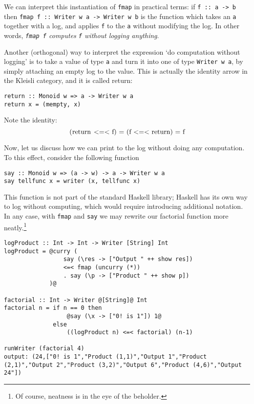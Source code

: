 \documentclass[11pt]{article}
\theoremstyle{nonumberplain}
\newcommand*\lsin{\lstinline}
\newcommand*\lsmath[1]{\text{\lstinline|#1|}}
\begin{document}
We can interpret this instantiation of \lsin|fmap| in practical terms: if \lsin|f :: a -> b| then \lsin|fmap f :: Writer w a -> Writer w b| is the function which takes an \lsin|a| together with a log, and applies \lsin|f| to the \lsin|a| without modifying the log. In other words, \emph{\lsin|fmap f| computes \lsin|f| without logging anything}.

\smallskip

Another (orthogonal) way to interpret the expression `do computation without logging' is to take a value of type \lsin|a| and turn it into one of type \lsin|Writer w a|, by simply attaching an empty log to the value. This is actually the identity arrow in the Kleisli category, and it is called return:
\begin{lstlisting}
return :: Monoid w => a -> Writer w a
return x = (mempty, x)
\end{lstlisting}

Note the identity:
\begin{equation}
\lsmath{(return <=< f) = (f <=< return) = f}
\end{equation}

\smallskip

Now, let us discuss how we can print to the log without doing any computation. To this effect, consider the following function
\begin{lstlisting}
say :: Monoid w => (a -> w) -> a -> Writer w a
say tellfunc x = writer (x, tellfunc x)
\end{lstlisting}

This function is not part of the standard Haskell library; Haskell has its own way to log without computing, which would require introducing additional notation. In any case, with \lsin|fmap| and \lsin|say| we may rewrite our factorial function more neatly.\footnote{Of course, neatness is in the eye of the beholder.}
\begin{lstlisting}
logProduct :: Int -> Int -> Writer [String] Int
logProduct = @curry (
                 say (\res -> ["Output " ++ show res])
                 <=< fmap (uncurry (*))
                 . say (\p -> ["Product " ++ show p])
             )@

factorial :: Int -> Writer @[String]@ Int
factorial n = if n == 0 then
                  @say (\x -> ["0! is 1"]) 1@
              else
                  ((logProduct n) <=< factorial) (n-1)

runWriter (factorial 4)
output: (24,["0! is 1","Product (1,1)","Output 1","Product (2,1)","Output 2","Product (3,2)","Output 6","Product (4,6)","Output 24"])
\end{lstlisting}
\end{document}
